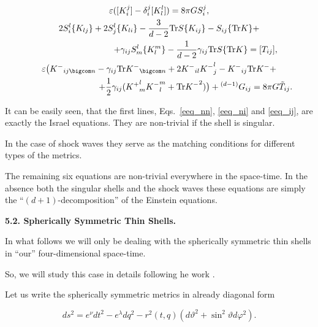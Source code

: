 \begin{gather}

\label{eeq_ij}

\varepsilon([K_i^j]-\delta_i^j [K_l^l]) = 8\pi G S_i^j,\\

2S_i^l\{K_{lj}\} + 2S_j^l\{K_{li}\}-\frac{3}{d-2}\mbox{Tr}S\{K_{ij}\}-S_{ij}\{\mbox{Tr}K\}+\\

 \hspace{3cm}      +\gamma_{ij}S_m^l\{K_l^m\} - \frac{1}{d-2}\gamma_{ij}\mbox{Tr}S\{\mbox{Tr}K\} =[T_{ij}],\\

\varepsilon\bigl({K^-}_{ij\bigcom n}-\gamma_{ij}{\mbox{Tr}K^-}_{\bigcom n} + 2{K^-}_{il}{K^-}_j^l-{K^-}_{ij}{\mbox{Tr}K^-}+\\

 \hspace{3cm} +\frac{1}{2}\gamma_{ij}({K^+}_m^l{K^-}_l^m+{\mbox{Tr}K^-}^2)\bigr)+{ ^{(d-1)}}G_{ij}=8\pi G \tilde T_{ij}.

\end{gather}



It can be easily seen, that the first lines, Eqs.~\eqref{eeq_nn}, \eqref{eeq_ni} and \eqref{eeq_ij}, are exactly  the Israel equations. They are non-trivial if the shell is singular. 

In the case of shock waves they serve as the matching conditions for different types of the metrics.

The remaining six equations are non-trivial everywhere in the space-time. In the absence both the singular shells and the shock waves these equations are simply the ``$(d + 1)$-decomposition'' of the Einstein equations.



\smallskip



\textbf{5.2. Spherically Symmetric Thin Shells.}


In what follows we will only be dealing with the spherically symmetric thin shells in ``our'' four-dimensional space-time. 

So, we will study this case in details following he work \cite{berez:BKT2}.



Let us write the spherically symmetric metrics in already diagonal form

\begin{equation}

\label{ds_diag}

ds^2 = e^{\nu}dt^2 - e^{\lambda}dq^2 -  r^2 (t,q) (d\vartheta^2 + \sin^2{\vartheta} d \varphi^2).

\end{equation}

